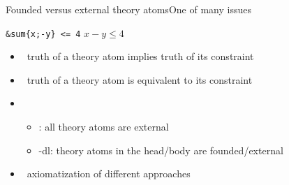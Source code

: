 \begin{frame}{Founded versus external theory atoms}{One of many issues}
  \begin{center}
    \texttt{\&sum\{x;-y\} <= 4} \qquad\qquad $x-y\leq 4$
   \end{center}
   \bigskip
  \begin{itemize}
    \item<2->   \ truth of a theory atom implies truth of its constraint
    \item<2->  \ truth of a theory atom is equivalent to its constraint
      \bigskip
    \item<3-> 
      \begin{itemize}
      \item \clingcon:  all theory atoms are external
      \item \clingo-dl: theory atoms in the head/body are founded/external
      \end{itemize}
      \medskip
    \item<3->  \ axiomatization of different approaches
  \end{itemize}
\end{frame}
%
